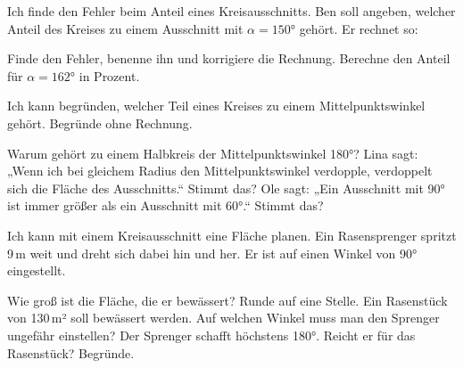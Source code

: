 \begin{aufgabe}{Ich finde den Fehler beim Anteil eines Kreisausschnitts. Ben soll angeben, welcher Anteil des Kreises zu einem Ausschnitt mit $\alpha = 150°$ gehört. Er rechnet so:}
\begin{teile}
\teil Finde den Fehler, benenne ihn und korrigiere die Rechnung.
\teil Berechne den Anteil für $\alpha = 162°$ in Prozent.
\end{teile}
\end{aufgabe}

\begin{aufgabe}{Ich kann begründen, welcher Teil eines Kreises zu einem Mittelpunktswinkel gehört. Begründe ohne Rechnung.}
\begin{teile}
\teil Warum gehört zu einem Halbkreis der Mittelpunktswinkel 180°?
\teil Lina sagt: „Wenn ich bei gleichem Radius den Mittelpunktswinkel verdopple, verdoppelt sich die Fläche des Ausschnitts.“ Stimmt das?
\teil Ole sagt: „Ein Ausschnitt mit 90° ist immer größer als ein Ausschnitt mit 60°.“ Stimmt das?
\end{teile}
\end{aufgabe}

\begin{aufgabe}{Ich kann mit einem Kreisausschnitt eine Fläche planen. Ein Rasensprenger spritzt 9\,m weit und dreht sich dabei hin und her. Er ist auf einen Winkel von 90° eingestellt.}
\begin{teile}
\teil Wie groß ist die Fläche, die er bewässert? Runde auf eine Stelle.
\teil Ein Rasenstück von 130\,m² soll bewässert werden. Auf welchen Winkel muss man den Sprenger ungefähr einstellen?
\teil Der Sprenger schafft höchstens 180°. Reicht er für das Rasenstück? Begründe.
\end{teile}
\end{aufgabe}
